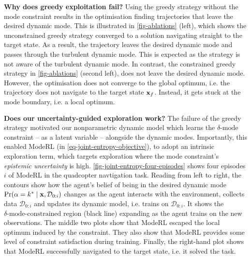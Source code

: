 \documentclass[twoside]{article}
\newcommand{\state}{\ensuremath{\mathbf{x}}}
\newcommand{\dataset}{\ensuremath{\mathcal{D}}}
\newcommand{\modeVar}{\ensuremath{\alpha}}
\begin{document}
\textbf{Why does greedy exploitation fail?}
Using the greedy strategy without the mode constraint results in the optimisation finding trajectories that leave the desired dynamic mode.
This is illustrated in \cref{fig-ablations} (left), which shows the unconstrained greedy strategy converged to a solution navigating
straight to the target state.
As a result, the trajectory leaves the desired dynamic mode and passes through the turbulent dynamic mode.
This is expected as the strategy is not aware of the turbulent dynamic mode.
In contrast, the constrained greedy strategy in \cref{fig-ablations} (second left), does not leave the desired dynamic mode.
However, the optimisation does not converge to the global optimum, i.e. the trajectory does not navigate to the target state \(\targetState\).
Instead, it gets stuck at the mode boundary, i.e. a local optimum.

\textbf{Does our uncertainty-guided exploration work?}
The failure of the greedy strategy motivated our nonparametric dynamic model which learns the \(\delta\text{-mode}\) constraint -- as a latent variable -- alongside the
dynamic modes.
Importantly, this enabled ModeRL (in \cref{eq-joint-entropy-objective}), to adopt an intrinsic exploration term,
which targets exploration where the mode constraint's \emph{epistemic uncertainty} is high.
\cref{fig-joint-entropy-four-episodes} shows four episodes \(i\) of ModeRL in the quadcopter navtigation task.
Reading from left to right, the contours show how the agent's belief of being in the desired dynamic mode \(\Pr(\modeVar=\desiredMode \mid \state, \dataset_{0:i})\)
changes as the agent interacts with the environment, collects data \(\dataset_{0:i}\) and updates its dynamic model, i.e. trains on \(\dataset_{0:i}\).
It shows the \(\delta\text{-mode-constrained}\) region (black line) expanding as the agent trains on the new observations.
The middle two plots show that ModeRL escaped the local optimum induced by the constraint.
They also show that ModeRL provides some level of constraint satisfaction during training.
Finally, the right-hand plot shows that ModeRL successfully navigated to the target state, i.e. it solved the task.
\end{document}
